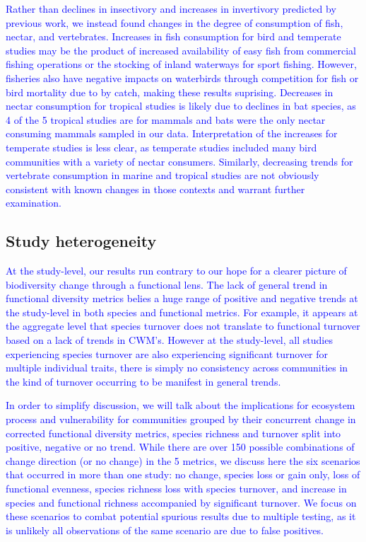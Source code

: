 \documentclass{article}
\begin{document}
\textcolor{blue}{Rather than declines in insectivory and increases in invertivory predicted by previous work, we instead found changes in the degree of consumption of fish, nectar, and vertebrates. Increases in fish consumption for bird and temperate studies may be the product of increased availability of easy fish from commercial fishing operations or the stocking of inland waterways for sport fishing. However, fisheries also have negative impacts on waterbirds through competition for fish or bird mortality due to by catch, making these results suprising. Decreases in nectar consumption for tropical studies is likely due to declines in bat species, as 4 of the 5 tropical studies are for mammals and bats were the only nectar consuming mammals sampled in our data. Interpretation of the increases for temperate studies is less clear, as temperate studies included many bird communities with a variety of nectar consumers. Similarly, decreasing trends for vertebrate consumption in marine and tropical studies are not obviously consistent with known changes in those contexts and warrant further examination.}

\hypertarget{study-heterogeneity}{%
\subsection{Study heterogeneity}\label{study-heterogeneity}}

\textcolor{blue}{At the study-level, our results run contrary to our hope for a clearer picture of biodiversity change through a functional lens. The lack of general trend in functional diversity metrics belies a huge range of positive and negative trends at the study-level in both species and functional metrics. For example, it appears at the aggregate level that species turnover does not translate to functional turnover based on a lack of trends in CWM's. However at the study-level, all studies experiencing species turnover are also experiencing significant turnover for multiple individual traits, there is simply no consistency across communities in the kind of turnover occurring to be manifest in general trends.}

\textcolor{blue}{In order to simplify discussion, we will talk about the implications for ecosystem process and vulnerability for communities grouped by their concurrent change in corrected functional diversity metrics, species richness and turnover split into positive, negative or no trend. While there are over 150 possible combinations of change direction (or no change) in the 5 metrics, we discuss here the six scenarios that occurred in more than one study: no change, species loss or gain only, loss of functional evenness, species richness loss with species turnover, and increase in species and functional richness accompanied by significant turnover. We focus on these scenarios to combat potential spurious results due to multiple testing, as it is unlikely all observations of the same scenario are due to false positives.}
\end{document}

